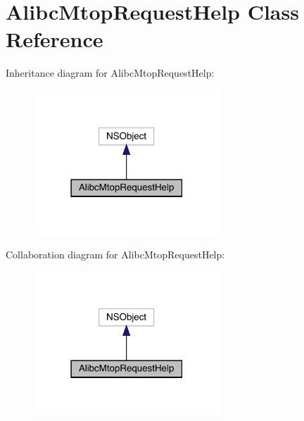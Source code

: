 \hypertarget{interface_alibc_mtop_request_help}{}\section{Alibc\+Mtop\+Request\+Help Class Reference}
\label{interface_alibc_mtop_request_help}


Inheritance diagram for Alibc\+Mtop\+Request\+Help\+:\nopagebreak
\begin{figure}[H]
\begin{center}
\leavevmode
\includegraphics[width=198pt]{interface_alibc_mtop_request_help__inherit__graph}
\end{center}
\end{figure}


Collaboration diagram for Alibc\+Mtop\+Request\+Help\+:\nopagebreak
\begin{figure}[H]
\begin{center}
\leavevmode
\includegraphics[width=198pt]{interface_alibc_mtop_request_help__coll__graph}
\end{center}
\end{figure}
